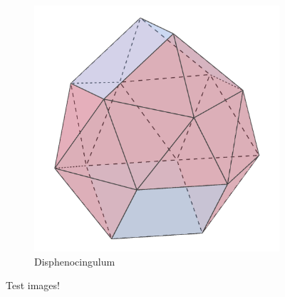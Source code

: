 \documentclass{article}
\begin{document}
\begin{figure}[h]
\begin{subfigure}{.33333\textwidth}
    \label{fig:polyhedra_2}
  \end{subfigure}%
  \begin{subfigure}{.33333\textwidth}
    \centering
    \includegraphics[width=.5\linewidth]{Disphenocingulum}
    \caption{Disphenocingulum}
    \label{fig:polyhedra_3}
  \end{subfigure}%
  \caption{Test images!}
  \label{fig:polyhedra}
\end{figure}
\end{document}
